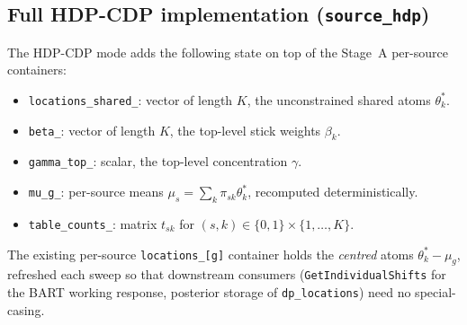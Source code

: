 \documentclass[11pt]{article}
\newcommand{\1}{\mathbf{1}}
\begin{document}
\subsection{Full HDP-CDP implementation (\texttt{source\_hdp})}\label{sec:impl-hdp}

The HDP-CDP mode adds the following state on top of the Stage~A per-source containers:

\begin{itemize}[noitemsep]
  \item \texttt{locations\_shared\_}: vector of length $K$, the unconstrained shared atoms $\theta^*_k$.
  \item \texttt{beta\_}: vector of length $K$, the top-level stick weights $\beta_k$.
  \item \texttt{gamma\_top\_}: scalar, the top-level concentration $\gamma$.
  \item \texttt{mu\_g\_}: per-source means $\mu_s = \sum_k \pi_{sk}\theta^*_k$, recomputed deterministically.
  \item \texttt{table\_counts\_}: matrix $t_{sk}$ for $(s, k) \in \{0,1\} \times \{1,\ldots,K\}$.
\end{itemize}
The existing per-source \texttt{locations\_[g]} container holds the \emph{centred} atoms $\theta^*_k - \mu_g$, refreshed each sweep so that downstream consumers (\texttt{GetIndividualShifts} for the BART working response, posterior storage of \texttt{dp\_locations}) need no special-casing.
\end{document}
